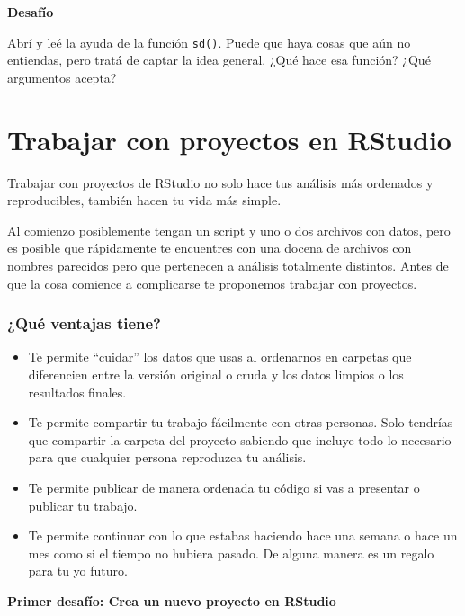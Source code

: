 \documentclass[
  openany]{book}
\providecommand{\tightlist}{%
  \setlength{\itemsep}{0pt}\setlength{\parskip}{0pt}}
\begin{document}
\textbf{Desafío}

Abrí y leé la ayuda de la función \texttt{sd()}.
Puede que haya cosas que aún no entiendas, pero tratá de captar la idea general.
¿Qué hace esa función?
¿Qué argumentos acepta?

\hypertarget{trabajar-con-proyectos-en-rstudio}{%
\chapter{Trabajar con proyectos en RStudio}\label{trabajar-con-proyectos-en-rstudio}}

Trabajar con proyectos de RStudio no solo hace tus análisis más ordenados y reproducibles, también hacen tu vida más simple.

Al comienzo posiblemente tengan un script y uno o dos archivos con datos, pero es posible que rápidamente te encuentres con una docena de archivos con nombres parecidos pero que pertenecen a análisis totalmente distintos.
Antes de que la cosa comience a complicarse te proponemos trabajar con proyectos.

\hypertarget{quuxe9-ventajas-tiene}{%
\subsection{¿Qué ventajas tiene?}\label{quuxe9-ventajas-tiene}}

\begin{itemize}
\tightlist
\item
  Te permite ``cuidar'' los datos que usas al ordenarnos en carpetas que diferencien entre la versión original o cruda y los datos limpios o los resultados finales.
\item
  Te permite compartir tu trabajo fácilmente con otras personas. Solo tendrías que compartir la carpeta del proyecto sabiendo que incluye todo lo necesario para que cualquier persona reproduzca tu análisis.
\item
  Te permite publicar de manera ordenada tu código si vas a presentar o publicar tu trabajo.
\item
  Te permite continuar con lo que estabas haciendo hace una semana o hace un mes como si el tiempo no hubiera pasado. De alguna manera es un regalo para tu yo futuro.
\end{itemize}

\textbf{Primer desafío: Crea un nuevo proyecto en RStudio}
\end{document}
